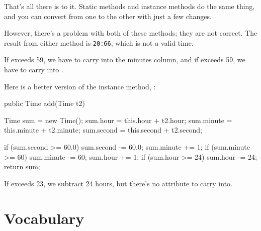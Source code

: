 That's all there is to it.
Static methods and instance methods do the same thing, and you can convert from one to the other with just a few changes.


However, there's a problem with both of these methods; they are not correct.
The result from either method is {\tt 20:66}, which is not a valid time.

If  exceeds 59, we have to carry into the minutes column, and if  exceeds 59, we have to carry into .

Here is a better version of the instance method, :

\begin{code}
public Time add(Time t2) {
    Time sum = new Time();
    sum.hour = this.hour + t2.hour;
    sum.minute = this.minute + t2.minute;
    sum.second = this.second + t2.second;

    if (sum.second >= 60.0) {
        sum.second -= 60.0;
        sum.minute += 1;
    }
    if (sum.minute >= 60) {
        sum.minute -= 60;
        sum.hour += 1;
    }
    if (sum.hour >= 24) {
        sum.hour -= 24;
    }
    return sum;
}
\end{code}

If  exceeds 23, we subtract 24 hours, but there's no
 attribute to carry into.


\section{Vocabulary}

